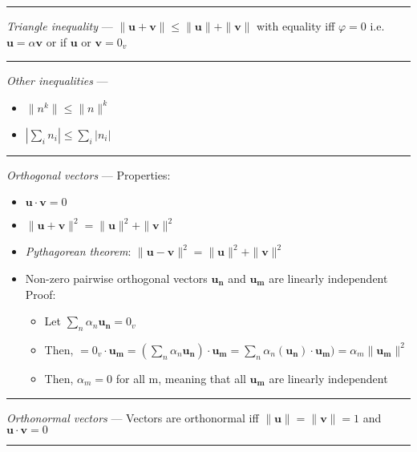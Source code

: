 {\color{lightgray}\hrule height 0.001mm}

\emph{Triangle inequality} --- 
$\|\boldsymbol{u} + \boldsymbol{v}\| \leq \|\boldsymbol{u}\| + \|\boldsymbol{v}\|$ with equality iff $\varphi = 0$ i.e. $\boldsymbol{u} = \alpha\boldsymbol{v}$ or if $\boldsymbol{u} \textrm{ or } \boldsymbol{v} = 0_v$

{\color{lightgray}\hrule height 0.001mm}

\emph{Other inequalities} ---  

\begin{itemize}
    \item $\|n^k\| \leq \|n\|^k$
    \item $|\sum_i n_i| \leq \sum_i |n_i|$
\end{itemize}

{\color{lightgray}\hrule height 0.001mm}

\emph{Orthogonal vectors} ---  Properties:
\begin{itemize}
    \item $\boldsymbol{u} \cdot \boldsymbol{v} = 0$
    \item $\|\boldsymbol{u} + \boldsymbol{v}\|^2 = \|\boldsymbol{u}\|^2 + \|\boldsymbol{v}\|^2$
    \item \emph{Pythagorean theorem}: $\|\boldsymbol{u} - \boldsymbol{v}\|^2 = \|\boldsymbol{u}\|^2 + \|\boldsymbol{v}\|^2$
    \item Non-zero pairwise orthogonal vectors $\boldsymbol{u_n}$ and $\boldsymbol{u_m}$ are linearly independent\\
    Proof:
    \begin{itemize}
        \item Let $\sum_n \alpha_n \boldsymbol{u_n} = 0_v$
        \item Then, $ = 0_v \cdot \boldsymbol{u_m} = (\sum_n \alpha_n \boldsymbol{u_n}) \cdot \boldsymbol{u_m} = \sum_n \alpha_n (\boldsymbol{u_n}) \cdot \boldsymbol{u_m}) = \alpha_m \|\boldsymbol{u_m}\|^2$
        \item Then, $\alpha_m = 0$ for all m, meaning that all $\boldsymbol{u_m}$ are linearly independent
    \end{itemize}
\end{itemize}

{\color{lightgray}\hrule height 0.001mm}

\emph{Orthonormal vectors} ---  Vectors are orthonormal iff $\|\boldsymbol{u}\| = \|\boldsymbol{v}\| = 1$ and $\boldsymbol{u} \cdot \boldsymbol{v} = 0$

{\color{lightgray}\hrule height 0.001mm}

